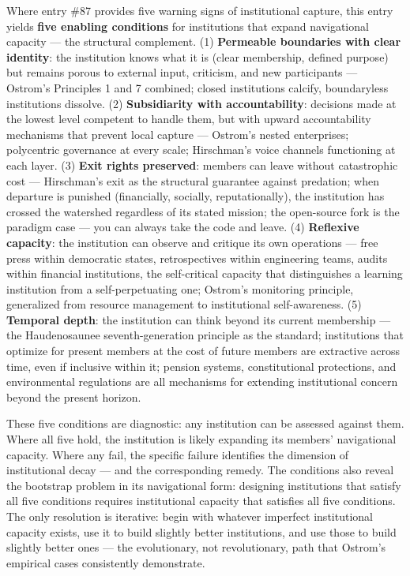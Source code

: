 Where entry \#87 provides five warning signs of institutional capture, this entry yields \textbf{five enabling conditions} for institutions that expand navigational capacity — the structural complement. (1) \textbf{Permeable boundaries with clear identity}: the institution knows what it is (clear membership, defined purpose) but remains porous to external input, criticism, and new participants — Ostrom's Principles 1 and 7 combined; closed institutions calcify, boundaryless institutions dissolve. (2) \textbf{Subsidiarity with accountability}: decisions made at the lowest level competent to handle them, but with upward accountability mechanisms that prevent local capture — Ostrom's nested enterprises; polycentric governance at every scale; Hirschman's voice channels functioning at each layer. (3) \textbf{Exit rights preserved}: members can leave without catastrophic cost — Hirschman's exit as the structural guarantee against predation; when departure is punished (financially, socially, reputationally), the institution has crossed the watershed regardless of its stated mission; the open-source fork is the paradigm case — you can always take the code and leave. (4) \textbf{Reflexive capacity}: the institution can observe and critique its own operations — free press within democratic states, retrospectives within engineering teams, audits within financial institutions, the self-critical capacity that distinguishes a learning institution from a self-perpetuating one; Ostrom's monitoring principle, generalized from resource management to institutional self-awareness. (5) \textbf{Temporal depth}: the institution can think beyond its current membership — the Haudenosaunee seventh-generation principle as the standard; institutions that optimize for present members at the cost of future members are extractive across time, even if inclusive within it; pension systems, constitutional protections, and environmental regulations are all mechanisms for extending institutional concern beyond the present horizon.


These five conditions are diagnostic: any institution can be assessed against them. Where all five hold, the institution is likely expanding its members' navigational capacity. Where any fail, the specific failure identifies the dimension of institutional decay — and the corresponding remedy. The conditions also reveal the bootstrap problem in its navigational form: designing institutions that satisfy all five conditions requires institutional capacity that satisfies all five conditions. The only resolution is iterative: begin with whatever imperfect institutional capacity exists, use it to build slightly better institutions, and use those to build slightly better ones — the evolutionary, not revolutionary, path that Ostrom's empirical cases consistently demonstrate.


